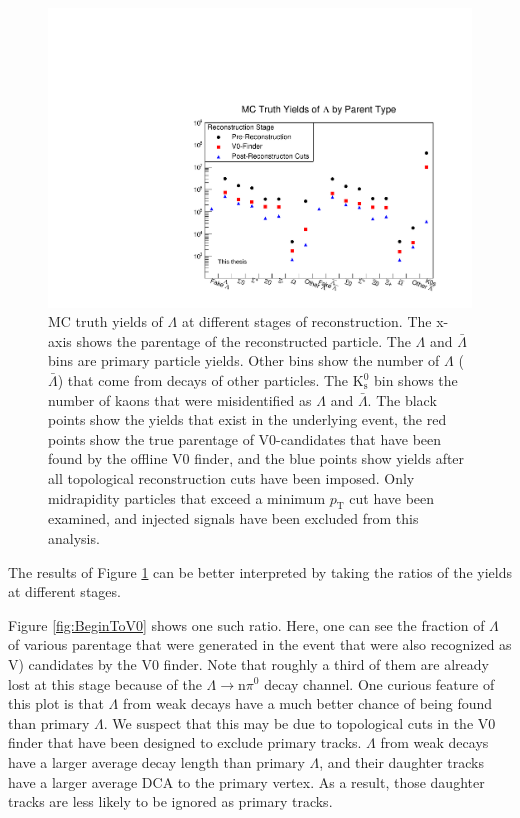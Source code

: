 \begin{figure}[hbtp]
\includegraphics[width=36pc]{Figures/2014-02-03-MCYields.pdf}
\caption[$\Lambda$ MC Yields at Different Reconstruction Stages]{
MC truth yields of $\Lambda$ at different stages of reconstruction.
The x-axis shows the parentage of the reconstructed particle. 
The $\Lambda$ and $\bar{\Lambda}$ bins are primary particle yields.  
Other bins show the number of $\Lambda$ ($\bar{\Lambda}$) that come from decays of other particles. 
The $\mathrm{K^0_s}$ bin shows the number of kaons that were misidentified as $\Lambda$ and $\bar{\Lambda}$.
The black points show the yields that exist in the underlying event, the red points show the true parentage of V0-candidates that have been found by the offline V0 finder, and the blue points show yields after all topological reconstruction cuts have been imposed.
Only midrapidity particles that exceed a minimum $p_\mathrm{T}$ cut have been examined, and injected signals have been excluded from this analysis.}
\label{fig:MCYields}
\end{figure}

The results of Figure \ref{fig:MCYields} can be better interpreted by taking the ratios of the yields at different stages.  

Figure \ref{fig:BeginToV0} shows one such ratio.
Here, one can see the fraction of $\Lambda$ of various parentage that were generated in the event that were also recognized as V) candidates by the V0 finder.
Note that roughly a third of them are already lost at this stage because of the $\Lambda \rightarrow \mathrm{n}\pi^0$ decay channel.
One curious feature of this plot is that $\Lambda$ from weak decays have a much better chance of being found than primary $\Lambda$.
We suspect that this may be due to topological cuts in the V0 finder that have been designed to exclude primary tracks.
$\Lambda$ from weak decays have a larger average decay length than primary $\Lambda$, and their daughter tracks have a larger average DCA to the primary vertex.
As a result, those daughter tracks are less likely to be ignored as primary tracks.

